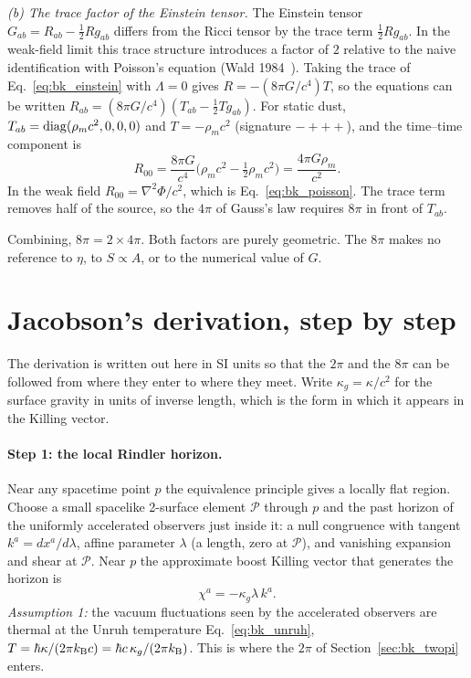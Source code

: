 \emph{(b) The trace factor of the Einstein tensor.} The Einstein tensor $G_{ab}=R_{ab}-\tfrac12Rg_{ab}$ differs from the Ricci tensor by the trace term
$\tfrac12Rg_{ab}$. In the weak-field limit this trace structure introduces a factor of $2$ relative to the naive identification with Poisson's equation
(Wald 1984~\cite{Wald1984}). Taking the trace of Eq.~\eqref{eq:bk_einstein} with $\Lambda=0$ gives $R=-(8\pi G/c^4)T$, so the equations can be written
$R_{ab}=(8\pi G/c^4)(T_{ab}-\tfrac12Tg_{ab})$. For static dust, $T_{ab}={\rm diag}(\rho_m c^2,0,0,0)$ and $T=-\rho_m c^2$ (signature $-+++$), and the time--time
component is
\begin{equation}
R_{00}=\frac{8\pi G}{c^4}\Big(\rho_m c^2-\tfrac12\rho_m c^2\Big)=\frac{4\pi G\rho_m}{c^2}.
\end{equation}
In the weak field $R_{00}=\nabla^2\Phi/c^2$, which is Eq.~\eqref{eq:bk_poisson}. The trace term removes half of the source, so the $4\pi$ of Gauss's law requires $8\pi$ in
front of $T_{ab}$. \derived

Combining, $8\pi=2\times4\pi$. Both factors are purely geometric. The $8\pi$ makes no reference to $\eta$, to $S\propto A$, or to the numerical value of $G$. \derived

\section{Jacobson's derivation, step by step}\label{sec:bk_jacobson}
The derivation is written out here in SI units so that the $2\pi$ and the $8\pi$ can be followed from where they enter to where they meet. Write
$\kappa_g=\kappa/c^2$ for the surface gravity in units of inverse length, which is the form in which it appears in the Killing vector.

\paragraph{Step 1: the local Rindler horizon.} Near any spacetime point $p$ the equivalence principle gives a locally flat region. Choose a small
spacelike 2-surface element $\mathcal P$ through $p$ and the past horizon of the uniformly accelerated observers just inside it: a null congruence with
tangent $k^a=dx^a/d\lambda$, affine parameter $\lambda$ (a length, zero at $\mathcal P$), and vanishing expansion and shear at $\mathcal P$. Near $p$ the
approximate boost Killing vector that generates the horizon is
\begin{equation}
\chi^a=-\kappa_g\lambda\,k^a .
\end{equation}
\emph{Assumption 1:} the vacuum fluctuations seen by the accelerated observers are thermal at the Unruh temperature Eq.~\eqref{eq:bk_unruh}, $T=\hbar\kappa/(2\pi k_{\mathrm B} c)
=\hbar c\,\kappa_g/(2\pi k_{\mathrm B})$. This is where the $2\pi$ of Section~\ref{sec:bk_twopi} enters. \derived{}

